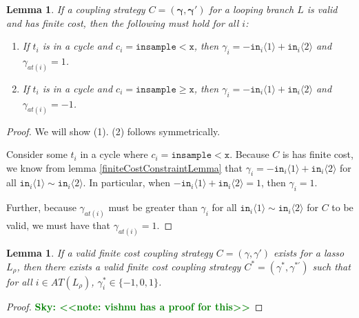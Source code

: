 \documentclass[12pt]{article}
\newcommand{\gguard}[1][x]{\texttt{insample}\geq#1}
\newcommand{\lguard}[1][x]{\texttt{insample} < #1}
\newcommand{\brangle}[1]{\langle#1 \rangle}
\newcommand{\todo}[2]{\textcolor{#1}{\textbf{#2}}}
\newcommand{\sky}[1]{\todo{green}{Sky: <<#1>>}}
\newtheorem{lemma}[thm]{Lemma}
\theoremstyle{definition}
\begin{document}
\begin{lemma}\label{cycleGammaConstraints}
    If a coupling strategy $C=(\mathbf{\gamma}, \mathbf{\gamma}')$ for a looping branch $L$ is valid and has finite cost, then the following must hold for all $i$:
    \begin{enumerate}
        \item If $t_i$ is in a cycle and $c_i = \lguard[\texttt{x}]$, then $\gamma_i = -\texttt{in}_i\brangle{1}+\texttt{in}_i\brangle{2}$ and $\gamma_{at(i)} = 1$.
        \item If $t_i$ is in a cycle and $c_i = \gguard[\texttt{x}]$, then $\gamma_i = -\texttt{in}_i\brangle{1}+\texttt{in}_i\brangle{2}$ and $\gamma_{at(i)} = -1$.
    \end{enumerate}
\end{lemma}
\begin{proof}
    We will show (1). (2) follows symmetrically.

    Consider some $t_i$ in a cycle where $c_i = \lguard[\texttt{x}]$. Because $C$ is has finite cost, we know from lemma \ref{finiteCostConstraintLemma} that $\gamma_i = -\texttt{in}_i\brangle{1}+\texttt{in}_i\brangle{2}$ for all  $\texttt{in}_i\brangle{1}\sim\texttt{in}_i\brangle{2}$. In particular, when $-\texttt{in}_i\brangle{1}+\texttt{in}_i\brangle{2}=1$, then $\gamma_i=1$. 
    
    Further, because $\gamma_{at(i)}$ must be greater than $\gamma_i$ for all $\texttt{in}_i\brangle{1}\sim\texttt{in}_i\brangle{2}$ for $C$ to be valid, we must have that $\gamma_{at(i)}=1$.
\end{proof}
\begin{lemma}
    If a valid finite cost coupling strategy $C = (\gamma, \gamma')$ exists for a lasso $L_\rho$, then there exists a valid finite cost coupling strategy $C^*= (\gamma^*, \gamma^{*\prime})$ such that for all $i\in AT(L_\rho)$, $\gamma_i^*\in \{-1, 0, 1\}$. 
\end{lemma}
\begin{proof}
    \sky{note: vishnu has a proof for this}

\end{proof}
\end{document}
